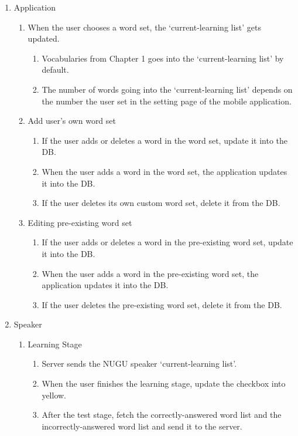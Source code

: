 \documentclass[conference]{IEEEtran}
\begin{document}
\begin{enumerate}
\item Application
    \begin{enumerate}
    \item When the user chooses a word set, the ‘current-learning list’ gets updated.
        \begin{enumerate}
        \item Vocabularies from Chapter 1 goes into the ‘current-learning list’ by default.
        \item The number of words going into the ‘current-learning list’ depends on the number the user set in the setting page of the mobile application.
        \end{enumerate}
    \item Add user’s own word set
        \begin{enumerate}
        \item If the user adds or deletes a word in the word set, update it into the DB.
        \item When the user adds a word in the word set, the application updates it into the DB.
        \item If the user deletes its own custom word set, delete it from the DB.
        \end{enumerate}
    \item Editing pre-existing word set
        \begin{enumerate}
        \item If the user adds or deletes a word in the pre-existing word set, update it into the DB.
        \item When the user adds a word in the pre-existing word set, the application updates it into the DB.
        \item If the user deletes the pre-existing word set, delete it from the DB.
        \end{enumerate}
    \end{enumerate}
\item Speaker
    \begin{enumerate}
    \item Learning Stage
        \begin{enumerate}
        \item Server sends the NUGU speaker ‘current-learning list’.
        \item When the user finishes the learning stage, update the checkbox into yellow.
        \item After the test stage, fetch the correctly-answered word list and the incorrectly-answered word list and send it to the server.

\end{enumerate}
\end{enumerate}
\end{enumerate}
\end{document}
